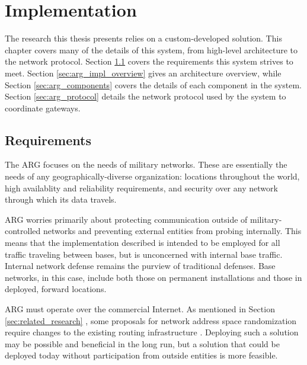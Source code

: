 \chapter{Implementation}
\label{chp:implementation}

\par The research this thesis presents relies on a custom-developed solution. This chapter covers many of the details of this system, from high-level architecture to the network protocol. Section \ref{sec:arg_requirements} covers the requirements this system strives to meet. Section \ref{sec:arg_impl_overview} gives an architecture overview, while Section \ref{sec:arg_components} covers the details of each component in the system. Section \ref{sec:arg_protocol} details the network protocol used by the system to coordinate gateways.

\section{Requirements}
\label{sec:arg_requirements}
\par The \ac{ARG} focuses on the needs of military networks. These are essentially the needs of any geographically-diverse organization: locations throughout the world, high availablity and reliability requirements, and security over any network through which its data travels. 

\par ARG worries primarily about protecting communication outside of military-controlled networks and preventing external entities from probing internally. This means that the implementation described is intended to be employed for all traffic traveling between bases, but is unconcerned with internal base traffic. Internal network defense remains the purview of traditional defenses. Base networks, in this case, include both those on permanent installations and those in deployed, forward locations. 

\par ARG must operate over the commercial Internet. As mentioned in Section \ref{sec:related_research} , some proposals for network address space randomization require changes to the existing routing infrastructure \cite{CONTRA}. Deploying such a solution may be possible and beneficial in the long run, but a solution that could be deployed today without participation from outside entities is more feasible.


